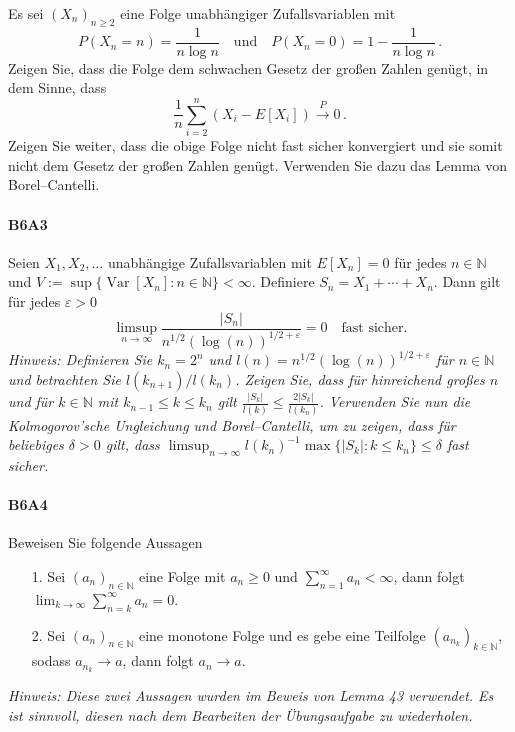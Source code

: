 \documentclass{article}
\begin{document}
Es sei $(X_n)_{n\geq2}$ eine Folge unabhängiger Zufallsvariablen mit
\[
P(X_n=n)=\frac{1}{n\log n}\quad\text{und}\quad P(X_n=0)=1-\frac{1}{n\log n}\,.
\]
Zeigen Sie, dass die Folge dem schwachen Gesetz der großen Zahlen genügt, in dem Sinne, dass
\[
\frac{1}{n}\sum_{i=2}^n(X_i-E[X_i])\xrightarrow{P}0\,.
\]
Zeigen Sie weiter, dass die obige Folge nicht fast sicher konvergiert und sie somit nicht dem Gesetz der großen Zahlen genügt.
Verwenden Sie dazu das Lemma von Borel--Cantelli.
\newpage

\paragraph{B6A3}
Seien $X_1,X_2,\dots$ unabhängige Zufallsvariablen mit $E[X_n]=0$ für jedes $n\in\mathbb{N}$ und $V:=\sup\{\operatorname{Var}[X_n]:n\in\mathbb{N}\}<\infty$.
Definiere $S_n=X_1+\cdots+X_n$.
Dann gilt für jedes $\varepsilon>0$
\[
  \limsup_{n\to\infty}\frac{|S_n|}{n^{1/2}(\log(n))^{1/2+\varepsilon}}=0\quad\text{fast sicher.}
\]
\emph{Hinweis: Definieren Sie $k_n=2^n$ und $l(n)=n^{1/2}(\log(n))^{1/2+\varepsilon}$ für $n\in\mathbb{N}$ und betrachten Sie $l(k_{n+1})/l(k_n)$.
  Zeigen Sie, dass für hinreichend großes $n$ und für $k\in\mathbb{N}$ mit $k_{n-1}\leq k\leq k_n$ gilt $\frac{|S_k|}{l(k)}\leq\frac{2|S_k|}{l({k_n})}$.
Verwenden Sie nun die Kolmogorov'sche Ungleichung und Borel--Cantelli, um zu zeigen, dass für beliebiges $\delta>0$ gilt, dass $\limsup_{n\to\infty}l(k_n)^{-1}\max\{|S_k|: k\leq k_n\}\leq\delta$ fast sicher.}
\newpage

\paragraph{B6A4}
Beweisen Sie folgende Aussagen
\begin{enumerate}
\item[1.] Sei $(a_n)_{n\in\mathbb{N}}$ eine Folge mit $a_n\geq0$ und $\sum_{n=1}^\infty a_n<\infty$, dann folgt $\lim_{k\to\infty}\sum_{n=k}^\infty a_n=0$.
\item[2.] Sei $(a_n)_{n\in\mathbb{N}}$ eine monotone Folge und es gebe eine Teilfolge $(a_{n_k})_{k\in\mathbb{N}}$, sodass $a_{n_k}\to a$, dann folgt $a_n\to a$.
\end{enumerate}
\emph{Hinweis: Diese zwei Aussagen wurden im Beweis von Lemma 43 verwendet.
Es ist sinnvoll, diesen nach dem Bearbeiten der Übungsaufgabe zu wiederholen.}
\newpage



\end{document}

